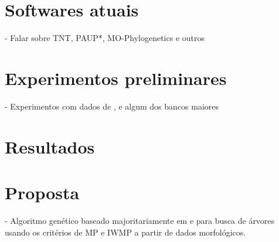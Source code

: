 \documentclass[12pt]{article}
\begin{document}
\section{Softwares atuais}
- Falar sobre TNT, PAUP*, MO-Phylogenetics e outros

\section{Experimentos preliminares}
- Experimentos com dados de \cite{dicynodonts-cris}, \cite{bremer-support} e algum dos bancos maiores

\section{Resultados}

\section{Proposta}
- Algoritmo genético baseado majoritariamente em \cite{cotta2002inferring} e \cite{garli} para busca de árvores usando os critérios de MP e IWMP a partir de dados morfológicos.





\end{document}
